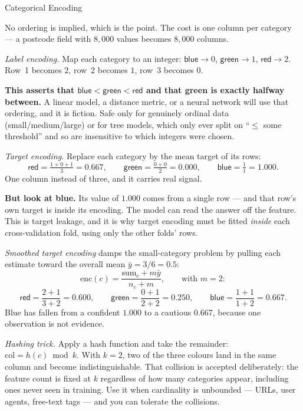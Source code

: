 \begin{v3topic}{Categorical Encoding}
\begin{workedexample}
No ordering is implied, which is the point. The cost is one column per
category --- a postcode field with $8{,}000$ values becomes $8{,}000$ columns.

\emph{Label encoding.} Map each category to an integer:
$\textsf{blue}\to0$, $\textsf{green}\to1$, $\textsf{red}\to2$. Row~1 becomes
$2$, row~2 becomes $1$, row~3 becomes $0$.

\textbf{This asserts that $\textsf{blue}<\textsf{green}<\textsf{red}$ and that
green is exactly halfway between.} A linear model, a distance metric, or a
neural network will use that ordering, and it is fiction. Safe only for
genuinely ordinal data (\textsf{small}/\textsf{medium}/\textsf{large}) or for
tree models, which only ever split on ``$\leq$ some threshold'' and so are
insensitive to which integers were chosen.

\emph{Target encoding.} Replace each category by the mean target of its rows:
\[
  \textsf{red} = \tfrac{1+0+1}{3} = 0.667,\qquad
  \textsf{green} = \tfrac{0+0}{2} = 0.000,\qquad
  \textsf{blue} = \tfrac{1}{1} = 1.000 .
\]
One column instead of three, and it carries real signal.

\textbf{But look at \textsf{blue}.} Its value of $1.000$ comes from a single
row --- and that row's own target is inside its encoding. The model can read
the answer off the feature. This is target leakage, and it is why target
encoding must be fitted \emph{inside} each cross-validation fold, using only
the other folds' rows.

\emph{Smoothed target encoding} damps the small-category problem by pulling
each estimate toward the overall mean $\bar y = 3/6 = 0.5$:
\[
  \text{enc}(c) = \frac{\text{sum}_c + m\bar y}{n_c + m},
  \qquad\text{with } m = 2:
\]
\[
  \textsf{red} = \frac{2 + 1}{3+2} = 0.600,\qquad
  \textsf{green} = \frac{0 + 1}{2+2} = 0.250,\qquad
  \textsf{blue} = \frac{1 + 1}{1+2} = 0.667 .
\]
\textsf{Blue} has fallen from a confident $1.000$ to a cautious $0.667$,
because one observation is not evidence.

\emph{Hashing trick.} Apply a hash function and take the remainder:
$\text{col} = h(c) \bmod k$. With $k=2$, two of the three colours land in the
same column and become indistinguishable. That collision is accepted
deliberately: the feature count is fixed at $k$ regardless of how many
categories appear, including ones never seen in training. Use it when
cardinality is unbounded --- URLs, user agents, free-text tags --- and you can
tolerate the collisions.
\end{workedexample}


\end{v3topic}
